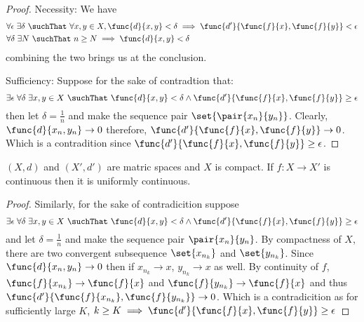 \begin{proof}
    Necessity: We have
    \begin{align*}
         & \forall \epsilon \; \exists \delta \  \suchThat \ \forall x,y \in X, \func{d}{x,y} < \delta \implies \func{d'}{\func{f}{x}, \func{f}{y}} < \epsilon \\
         & \forall \delta \; \exists N \ \suchThat \ n \geq N \implies \func{d}{x,y} < \delta
    \end{align*}
    combining the two brings us at the conclusion.

    Sufficiency: Suppose for the sake of contradtion that:
    \begin{equation*}
        \exists \epsilon \; \forall \delta \; \exists x,y \in X  \ \suchThat \ \func{d}{x,y} < \delta \land \func{d'}{\func{f}{x}, \func{f}{y}} \geq \epsilon
    \end{equation*}
    then let \(\delta = \frac{1}{n}\) and make the sequence pair \(\set{\pair{x_n}{y_n}}\). Clearly, \(\func{d}{x_n,y_n} \to 0\) therefore, \(\func{d'}{\func{f}{x}, \func{f}{y}} \to 0\). Which is a contradition since \(\func{d'}{\func{f}{x}, \func{f}{y}} \geq \epsilon \).
\end{proof}

\begin{proposition}
    \((X,d)\) and \((X',d')\) are matric spaces and \(X\) is compact. If \(f: X \to X'\) is continuous then it is uniformly continuous.
\end{proposition}

\begin{proof}
    Similarly, for the sake of contradicition suppose
    \begin{equation*}
        \exists \epsilon \; \forall \delta \; \exists x,y \in X \ \suchThat \ \func{d}{x,y} < \delta \land \func{d'}{\func{f}{x}, \func{f}{y}} \geq \epsilon
    \end{equation*}
    and let \(\delta = \frac{1}{n}\) and make the sequence pair \(\pair{x_n}{y_n}\). By compactness of \(X\), there are two convergent subsequence \(\set{x_{n_k}}\) and \(\set{y_{n_k}}\). Since \(\func{d}{x_n,y_n} \to 0\) then if \(x_{n_k} \to x\), \(y_{n_k} \to x\) as well. By continuity of \(f\), \(\func{f}{x_{n_k}} \to \func{f}{x}\) and \(\func{f}{y_{n_k}} \to \func{f}{x}\) and thus \(\func{d'}{\func{f}{x_{n_k}}, \func{f}{y_{n_k}}} \to 0 \). Which is a contradicition as for sufficiently large \(K\), \(k \geq K \implies \func{d'}{\func{f}{x}, \func{f}{y}} \geq \epsilon\)
\end{proof}

